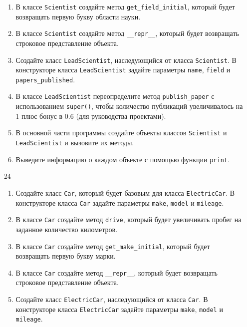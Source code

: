 \begin{enumerate}
\begin{enumerate}[leftmargin=*]
    \item В классе \texttt{Scientist} создайте метод \texttt{get\_field\_initial}, который будет возвращать первую букву области науки.
    
    \item В классе \texttt{Scientist} создайте метод \texttt{\_\_repr\_\_}, который будет возвращать строковое представление объекта.
    
    \item Создайте класс \texttt{LeadScientist}, наследующийся от класса \texttt{Scientist}. В конструкторе класса \texttt{LeadScientist} задайте параметры \texttt{name}, \texttt{field} и \texttt{papers\_published}.
    
    \item В классе \texttt{LeadScientist} переопределите метод \texttt{publish\_paper} с использованием \texttt{super()}, чтобы количество публикаций увеличивалось на 1 плюс бонус в 0.6 (для руководства проектами).
    
    \item В основной части программы создайте объекты классов \texttt{Scientist} и \texttt{LeadScientist} и вызовите их методы.
    
    \item Выведите информацию о каждом объекте с помощью функции \texttt{print}.
\end{enumerate}

\item[24] 
\begin{enumerate}[leftmargin=*]
    \item Создайте класс \texttt{Car}, который будет базовым для класса \texttt{ElectricCar}. В конструкторе класса \texttt{Car} задайте параметры \texttt{make}, \texttt{model} и \texttt{mileage}.
    
    \item В классе \texttt{Car} создайте метод \texttt{drive}, который будет увеличивать пробег на заданное количество километров.
    
    \item В классе \texttt{Car} создайте метод \texttt{get\_make\_initial}, который будет возвращать первую букву марки.
    
    \item В классе \texttt{Car} создайте метод \texttt{\_\_repr\_\_}, который будет возвращать строковое представление объекта.
    
    \item Создайте класс \texttt{ElectricCar}, наследующийся от класса \texttt{Car}. В конструкторе класса \texttt{ElectricCar} задайте параметры \texttt{make}, \texttt{model} и \texttt{mileage}.
    

\end{enumerate}
\end{enumerate}
